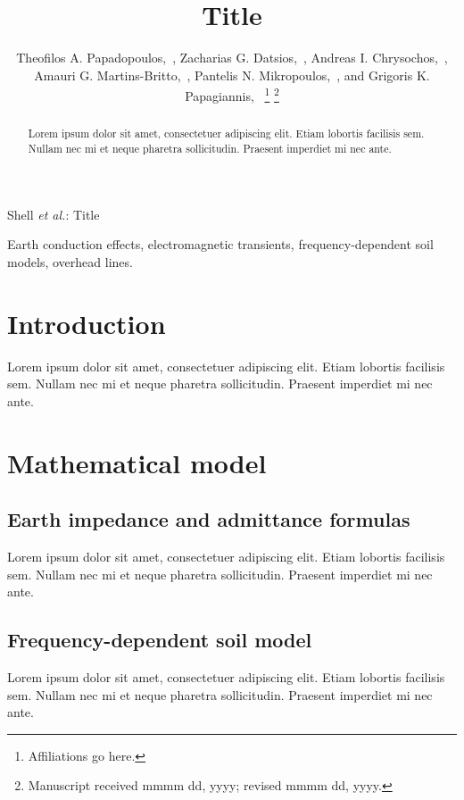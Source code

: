 \documentclass[lettersize,journal]{IEEEtran}
\newcommand*{\shortblindtext}{Lorem ipsum dolor sit amet, consectetuer adipiscing elit. Etiam lobortis facilisis sem. Nullam nec mi et neque pharetra sollicitudin. Praesent imperdiet mi nec ante.}
\newcommand{\paperTitle}{Title}
\begin{document}
\title{\paperTitle}

\author{Theofilos A. Papadopoulos,~, Zacharias G. Datsios,~, Andreas I. Chrysochos,~, Amauri G. Martins-Britto,~, Pantelis N. Mikropoulos,~, and Grigoris K. Papagiannis,~
\thanks{Affiliations go here.}%
\thanks{Manuscript received mmmm dd, yyyy; revised mmmm dd, yyyy.}}

%
{Shell \MakeLowercase{\textit{et al.}}: \paperTitle}


\maketitle

\begin{abstract}
\shortblindtext
\end{abstract}

\begin{IEEEkeywords}
Earth conduction effects, electromagnetic transients, frequency-dependent soil models, overhead lines.
\end{IEEEkeywords}

\section{Introduction}
\shortblindtext 

\section{Mathematical model}

\subsection{Earth impedance and admittance formulas}
\shortblindtext

\subsection{Frequency-dependent soil model}
\shortblindtext
\end{document}
